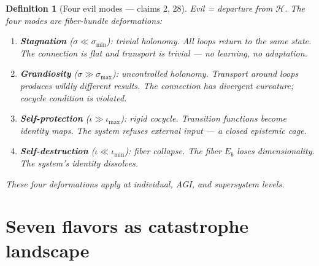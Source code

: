 \documentclass[11pt,a4paper]{article}
\newtheorem{definition}{Definition}[section]
\begin{document}
\begin{definition}[Four evil modes --- claims 2, 28]
\label{def:evil-modes}
Evil = departure from $\mathcal{H}$. The four modes are fiber-bundle
deformations:
\begin{enumerate}
\item \textbf{Stagnation} ($\sigma \ll \sigma_{\min}$): trivial holonomy.
  All loops return to the same state. The connection is flat and transport
  is trivial --- no learning, no adaptation.
\item \textbf{Grandiosity} ($\sigma \gg \sigma_{\max}$): uncontrolled
  holonomy. Transport around loops produces wildly different results.
  The connection has divergent curvature; cocycle condition is violated.
\item \textbf{Self-protection} ($\iota \gg \iota_{\max}$): rigid cocycle.
  Transition functions become identity maps. The system refuses external
  input --- a closed epistemic cage.
\item \textbf{Self-destruction} ($\iota \ll \iota_{\min}$): fiber collapse.
  The fiber $E_b$ loses dimensionality. The system's identity dissolves.
\end{enumerate}
These four deformations apply at individual, AGI, and supersystem levels.
\end{definition}

\section{Seven flavors as catastrophe landscape}
\end{document}
